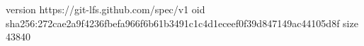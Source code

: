 version https://git-lfs.github.com/spec/v1
oid sha256:272cae2a9f4236fbefa966f6b61b3491c1c4d1eceef0f39d847149ac44105d8f
size 43840
